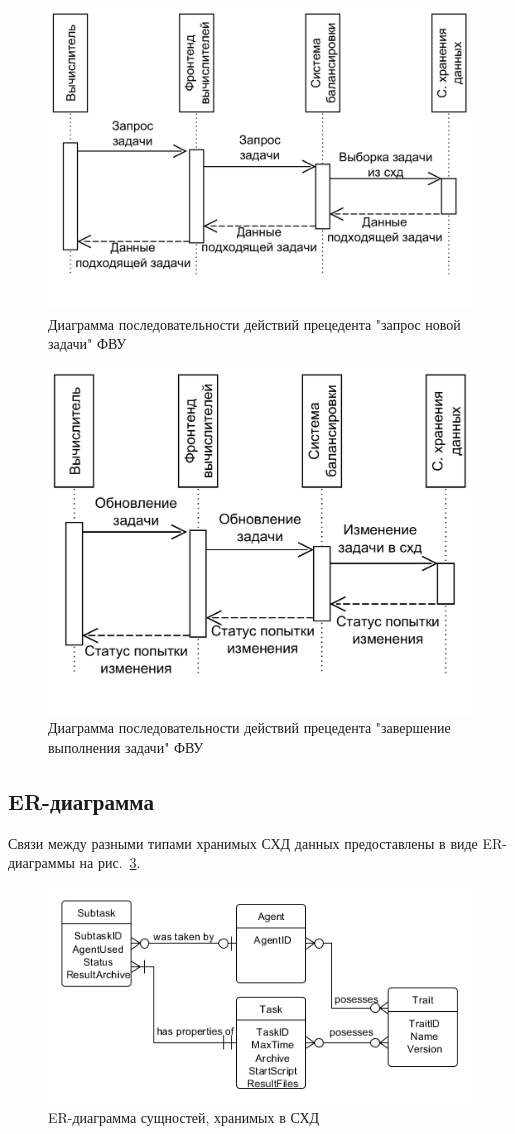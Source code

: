 \documentclass[a4paper,12pt]{report}
\numberwithin{equation}{section}
\begin{document}
\begin{figure}
  \centering
  \includegraphics[width=.7\linewidth]{../diagrams/frontnode/seq-request}
  \caption{Диаграмма последовательности действий прецедента "запрос новой задачи" ФВУ}
  \label{fig:seq-req}
\end{figure}

\begin{figure}
  \centering
  \includegraphics[width=.7\linewidth]{../diagrams/frontnode/seq-submit}
  \caption{Диаграмма последовательности действий прецедента "завершение выполнения задачи" ФВУ}
  \label{fig:seq-sub}
\end{figure}

\subsection{ER-диаграмма}

Связи между разными типами хранимых СХД данных предоставлены в виде ER-диаграммы на рис.~\ref{fig:db-er}.

\begin{figure}[h!]
  \centering
  \includegraphics[width=.9\linewidth]{../diagrams/db/er}
  \caption{ER-диаграмма сущностей, хранимых в СХД}
  \label{fig:db-er}
\end{figure}
\end{document}
